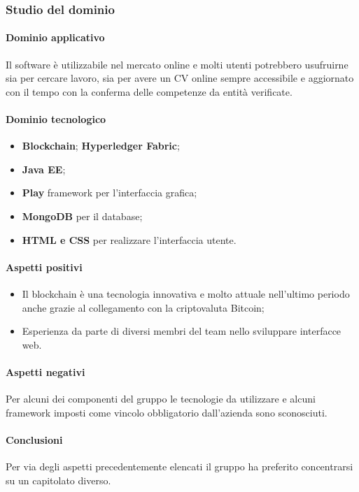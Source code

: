 	\subsubsection{Studio del dominio}
	\paragraph{Dominio applicativo} \Spazio
	Il software è utilizzabile nel mercato online e molti utenti potrebbero usufruirne sia per cercare lavoro, sia per avere un CV online sempre accessibile e aggiornato con il tempo con la conferma delle competenze da entità verificate.
	\paragraph{Dominio tecnologico} \Spazio
	\begin{itemize}
		\item \textbf{Blockchain};
		\textbf{Hyperledger Fabric};
		\item  \textbf{Java EE};
		\item  \textbf{Play} framework per l'interfaccia grafica;
		\item  \textbf{MongoDB} per il database;
		\item  \textbf{HTML e CSS} per realizzare l'interfaccia utente.
	\end{itemize}
	
	\paragraph{Aspetti positivi} \Spazio
	\begin{itemize}
		\item {Il blockchain è una tecnologia innovativa e molto attuale nell'ultimo periodo anche grazie al collegamento con la criptovaluta Bitcoin;}
		\item {Esperienza da parte di diversi membri del team nello sviluppare interfacce web.}
	\end{itemize} 
	\paragraph{Aspetti negativi} \Spazio
	Per alcuni dei componenti del gruppo le tecnologie da utilizzare e alcuni framework imposti come vincolo obbligatorio dall'azienda sono sconosciuti.
	\paragraph{Conclusioni} \Spazio
	Per via degli aspetti precedentemente elencati il gruppo ha preferito concentrarsi su un capitolato diverso.
	
